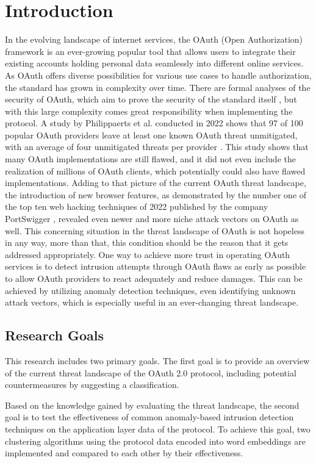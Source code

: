 \documentclass[
    fontsize=12pt,
    headings=small,
    parskip=half,           %
    bibliography=totoc,
    numbers=noenddot,       %
    open=any,               %
    ]{scrreprt}
\begin{document}
\chapter{Introduction}
\label{chap:introduction}
In the evolving landscape of internet services, the OAuth (Open Authorization) framework is an ever-growing popular tool that allows users to integrate their existing accounts holding personal data seamlessly into different online services. As OAuth offers diverse possibilities for various use cases to handle authorization, the standard has grown in complexity over time. There are formal analyses of the security of OAuth, which aim to prove the security of the standard itself \cite{fett2016comprehensive}, but with this large complexity comes great responsibility when implementing the protocol. A study by Philippaerts et al. conducted in 2022 shows that 97 of 100 popular OAuth providers leave at least one known OAuth threat unmitigated, with an average of four unmitigated threats per provider \cite{philippaerts2022oauch}. This study shows that many OAuth implementations are still flawed, and it did not even include the realization of millions of OAuth clients, which potentially could also have flawed implementations. Adding to that picture of the current OAuth threat landscape, the introduction of new browser features, as demonstrated by the number one of the top ten web hacking techniques of 2022 published by the company PortSwigger \cite{kettle2022}, revealed even newer and more niche attack vectors on OAuth as well. This concerning situation in the threat landscape of OAuth is not hopeless in any way, more than that, this condition should be the reason that it gets addressed appropriately. One way to achieve more trust in operating OAuth services is to detect intrusion attempts through OAuth flaws as early as possible to allow OAuth providers to react adequately and reduce damages. This can be achieved by utilizing anomaly detection techniques, even identifying unknown attack vectors, which is especially useful in an ever-changing threat landscape.


\section{Research Goals}
This research includes two primary goals. The first goal is to provide an overview of the current threat landscape of the OAuth 2.0 protocol, including potential countermeasures by suggesting a classification. 

Based on the knowledge gained by evaluating the threat landscape, the second goal is to test the effectiveness of common anomaly-based intrusion detection techniques on the application layer data of the protocol. To achieve this goal, two clustering algorithms using the protocol data encoded into word embeddings are implemented and compared to each other by their effectiveness.
\end{document}
